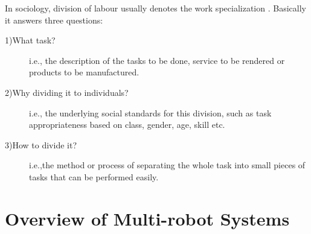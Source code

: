 In sociology, division of labour usually denotes the work specialization \cite{Sayer+1992}. Basically it answers three questions:
\begin{description}
\item[1)What task?] i.e., the description of the tasks to be done, service to be rendered or products to be manufactured.
\item[2)Why dividing it to individuals?] i.e., the underlying social standards for this division, such as task appropriateness based on class, gender, age, skill etc.
\item[3)How to divide it?] i.e.,the method or process of separating the whole task into small pieces of tasks that can be performed easily. 
\end{description}
% 
\section{Overview of Multi-robot Systems}

